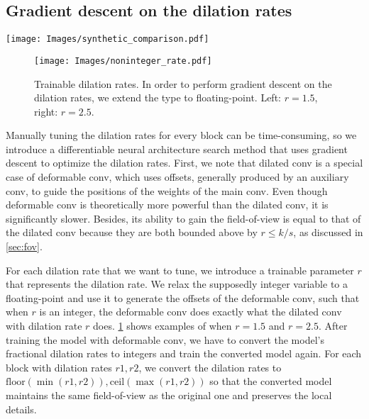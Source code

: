\documentclass[10pt,twocolumn,letterpaper]{article}
\begin{document}
\subsection{Gradient descent on the dilation rates}
\label{sec:dnas}

\begin{figure*}
  \centering
    \texttt{[image: Images/synthetic\_comparison.pdf]}
   \caption{Comparison between RegSeg and DDRNet23 on the toy dataset.}
   \label{fig:toy_comparison}
\end{figure*}

\begin{figure}
  \centering
    \texttt{[image: Images/noninteger\_rate.pdf]}

   \caption{Trainable dilation rates. In order to perform gradient descent on the dilation rates, we extend the type to floating-point. Left: $r=1.5$, right: $r=2.5$.}
   \label{fig:noninteger_rate}
\end{figure}



Manually tuning the dilation rates for every block can be time-consuming, so we introduce a differentiable neural architecture search method that uses gradient descent to optimize the dilation rates. First, we note that dilated conv is a special case of deformable conv\cite{dai2017deformable}, which uses offsets, generally produced by an auxiliary conv, to guide the positions of the weights of the main conv. Even though deformable conv is theoretically more powerful than the dilated conv, it is significantly slower. Besides, its ability to gain the field-of-view is equal to that of the dilated conv because they are both bounded above by $r\leq k/s$, as discussed in \cref{sec:fov}.

For each dilation rate that we want to tune, we introduce a trainable parameter $r$ that represents the dilation rate. We relax the supposedly integer variable to a floating-point and use it to generate the offsets of the deformable conv, such that when $r$ is an integer, the deformable conv does exactly what the dilated conv with dilation rate $r$ does. \cref{fig:noninteger_rate} shows examples of when $r=1.5$ and $r=2.5$. After training the model with deformable conv, we have to convert the model's fractional dilation rates to integers and train the converted model again. For each block with dilation rates $r1,r2$, we convert the dilation rates to $\text{floor}(\min(r1,r2)),\text{ceil}(\max(r1,r2))$ so that the converted model maintains the same field-of-view as the original one and preserves the local details.
\end{document}
